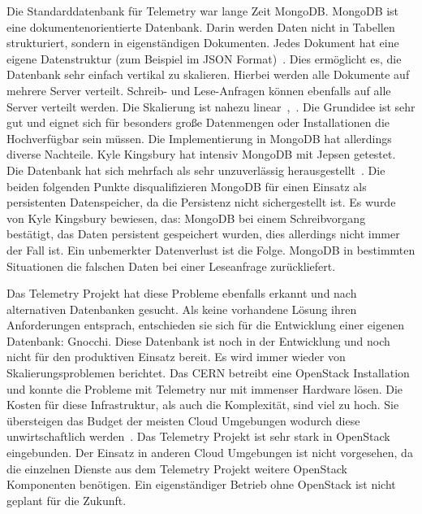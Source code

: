 \begin{outline}
  \1 Die Standarddatenbank für Telemetry war lange Zeit MongoDB\@. MongoDB ist
  eine dokumentenorientierte Datenbank. Darin werden Daten nicht in Tabellen
  strukturiert, sondern in eigenständigen Dokumenten. Jedes Dokument hat eine
  eigene Datenstruktur (zum Beispiel im \gls{JSON}
  Format)~\cite{Dokumentenorientierte_Datenbank}. Dies ermöglicht es, die
  Datenbank sehr einfach vertikal zu skalieren. Hierbei werden alle Dokumente
  auf mehrere Server verteilt. Schreib- und Lese-Anfragen können ebenfalls auf
  alle Server verteilt werden. Die Skalierung ist nahezu
  linear~\cite{MongoDB_Architecture},~\cite{What_is_MongoDB}. Die Grundidee ist
  sehr gut und eignet sich für besonders große Datenmengen oder Installationen
  die Hochverfügbar sein müssen. Die Implementierung in MongoDB hat allerdings
  diverse Nachteile. Kyle Kingsbury hat intensiv MongoDB mit \gls{Jepsen}
  getestet. Die Datenbank hat sich mehrfach als sehr unzuverlässig
  herausgestellt~\cite{MongoDB_on_Jepsen}. Die beiden folgenden Punkte
  disqualifizieren MongoDB für einen Einsatz als persistenten  Datenspeicher,
  da die Persistenz nicht sichergestellt ist. Es wurde von Kyle Kingsbury
  bewiesen, das:
    \2 MongoDB bei einem Schreibvorgang bestätigt, das Daten persistent
    gespeichert wurden, dies allerdings nicht immer der Fall ist. Ein
    unbemerkter Datenverlust ist die Folge.
    \2 MongoDB in bestimmten Situationen die falschen Daten bei einer
    Leseanfrage zurückliefert.

  \1 Das Telemetry Projekt hat diese Probleme ebenfalls erkannt und nach
  alternativen Datenbanken gesucht. Als keine vorhandene Lösung ihren
  Anforderungen entsprach, entschieden sie sich für die Entwicklung einer
  eigenen Datenbank: \gls{Gnocchi}. Diese Datenbank ist noch in der Entwicklung
  und noch nicht für den produktiven Einsatz bereit.
  \1 Es wird immer wieder von Skalierungsproblemen berichtet. Das CERN betreibt
  eine OpenStack Installation und konnte die Probleme mit Telemetry nur mit
  immenser Hardware lösen. Die Kosten für diese Infrastruktur, als auch die
  Komplexität, sind viel zu hoch. Sie übersteigen das Budget der meisten Cloud
  Umgebungen wodurch diese unwirtschaftlich werden~\cite{OpenStack_CERN}.
  \1 Das Telemetry Projekt ist sehr stark in OpenStack eingebunden. Der Einsatz
  in anderen Cloud Umgebungen ist nicht vorgesehen, da die einzelnen Dienste
  aus dem Telemetry Projekt weitere OpenStack Komponenten benötigen. Ein
  eigenständiger Betrieb ohne OpenStack ist nicht geplant für die Zukunft.
\end{outline}

